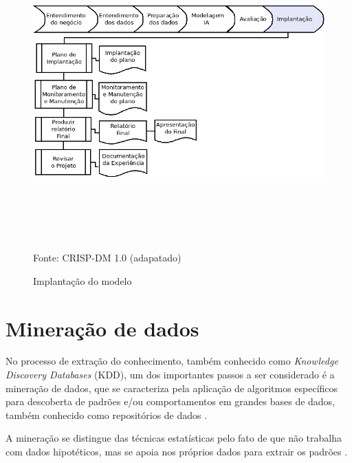 \begin{figure}[!ht]
\centering
\caption{Implantação do modelo}
\vspace{1mm}
\includegraphics[width=160mm, height=120mm]{Figuras/Cronograma/Implantacao.png}\\
\tiny Fonte: CRISP-DM 1.0 (adapatado)
\end{figure}


\pagebreak

\section{Mineração de dados}

No processo de extração do conhecimento, também conhecido como \textit{Knowledge Discovery Databases} (KDD), um dos importantes passos a ser considerado é a mineração de dados, que se caracteriza pela aplicação de algoritmos 
específicos para descoberta de padrões e/ou comportamentos em grandes bases de dados, também conhecido como repositórios de dados \cite{FayyadUeoutros}.

A mineração se distingue das técnicas estatísticas pelo fato de que  não trabalha com dados hipotéticos, mas se apoia nos próprios dados para extrair os padrões \cite{Castanheira2008}. 

